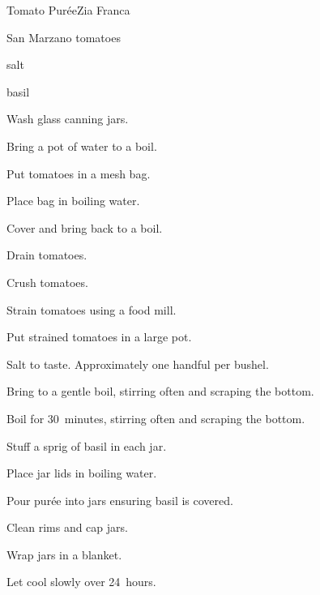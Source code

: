 \begin{recipe}{Tomato Pur\'ee}{Zia Franca}{}

\begin{ingredients}
\item San Marzano tomatoes
\item salt
\item basil
\end{ingredients}

\begin{directions}
\item Wash glass canning jars.
\item Bring a pot of water to a boil.
\item Put tomatoes in a mesh bag.
\item Place bag in boiling water.
\item Cover and bring back to a boil.
\item Drain tomatoes.
\item Crush tomatoes.
\item Strain tomatoes using a food mill.
\item Put strained tomatoes in a large pot.
\item Salt to taste. Approximately one handful per bushel.
\item Bring to a gentle boil, stirring often and scraping the bottom.
\item Boil for 30~minutes, stirring often and scraping the bottom.
\item Stuff a sprig of basil in each jar.
\item Place jar lids in boiling water.
\item Pour pur\'ee into jars ensuring basil is covered.
\item Clean rims and cap jars.
\item Wrap jars in a blanket.
\item Let cool slowly over 24~hours.
\end{directions}

\end{recipe}
